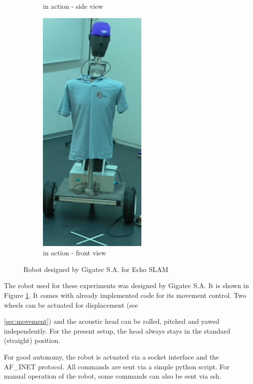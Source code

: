\begin{figure}[H]
\begin{subfigure}{0.3\linewidth}
        \caption{in action - side view}
    \end{subfigure}
    \begin{subfigure}{0.3\linewidth}
        \centering
        \includegraphics[height=0.3\textheight]{files/Robot3.png}
        \caption{in action - front view}
    \end{subfigure}
    \caption{Robot designed by Gigatec S.A. for Echo SLAM}
\label{fig:robot}
\end{figure}

The robot used for these experiments was designed by Gigatec S.A. It is shown in Figure \ref{fig:robot}.
It comes with already implemented code for its movement control. 
Two wheels can be actuated for displacement (see \par \ref{sec:movement}) and the acoustic head can be rolled, pitched and yawed independently. 
For the present setup, the head always stays in the standard (straight) position.

For good autonomy, the robot is actuated via a socket interface and the AF\_INET protocol. All commands are sent via a simple python script. For manual operation of the robot, some commands can also be sent via ssh.


